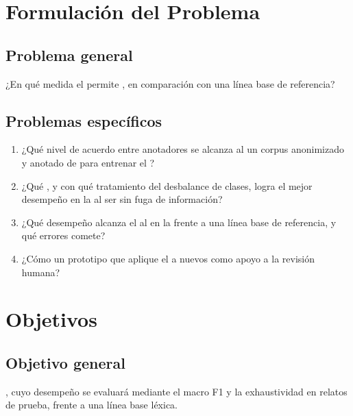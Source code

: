 \section{Formulación del Problema}

\subsection{Problema general}
¿En qué medida el   permite , en comparación con una línea base de referencia?

\subsection{Problemas específicos}
\begin{enumerate}[label=PE\arabic*:, leftmargin=1.6cm]
	\item ¿Qué nivel de acuerdo entre anotadores se alcanza al  un corpus anonimizado y anotado de  para entrenar el ?
	\item ¿Qué , y con qué tratamiento del desbalance de clases, logra el mejor desempeño en la  al ser  sin fuga de información?
	\item ¿Qué desempeño alcanza el  al  en la  frente a una línea base de referencia, y qué errores comete?
	\item ¿Cómo  un prototipo que aplique el  a nuevos  como apoyo a la revisión humana?
\end{enumerate}

\section{Objetivos}

\subsection{Objetivo general}
  , cuyo desempeño se evaluará mediante el macro F1 y la exhaustividad en relatos de prueba, frente a una línea base léxica.

